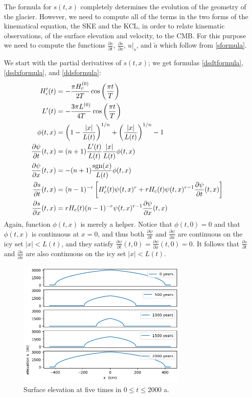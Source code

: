 \documentclass[letterpaper,final,12pt,reqno]{amsart}
\newcommand{\sgn}{\operatorname{sgn}}
\begin{document}
The formula for $s(t,x)$ completely determines the evolution of the geometry of the glacier.  However, we need to compute all of the terms in the two forms of the kinematical equation, the SKE and the KCL, in order to relate kinematic observations, of the surface elevation and velocity, to the CMB.  For this purpose we need to compute the functions $\frac{\partial s}{\partial t}$, $\frac{\partial s}{\partial x}$, $u|_s$, and $\tilde a$ which follow from \eqref{sformula}.

We start with the partial derivatives of $s(t,x)$; we get formulas \eqref{dsdtformula}, \eqref{dsdxformula}, and \eqref{ddsformula}:
\begin{align}
H_c'(t) &= - \frac{\pi H_c^{(0)}}{2T} \cos\left(\frac{\pi t}{T}\right) \notag\\
L'(t) &= - \frac{3 \pi L^{(0)}}{4T} \cos\left(\frac{\pi t}{T}\right) \notag \\
\phi(t,x) &= \left(1 - \frac{|x|}{L(t)}\right)^{1/n} + \left(\frac{|x|}{L(t)}\right)^{1/n} - 1 \notag \\
\frac{\partial \psi}{\partial t}(t,x) &= (n+1) \frac{L'(t)}{L(t)} \frac{|x|}{L(t)} \phi(t,x) \notag \\
\frac{\partial \psi}{\partial x}(t,x) &= - (n+1) \frac{\sgn(x)}{L(t)} \phi(t,x) \notag \\
\frac{\partial s}{\partial t}(t,x) &= (n-1)^{-r} \left[H_c'(t) \psi(t,x)^r + r H_c(t) \psi(t,x)^{r-1} \frac{\partial \psi}{\partial t}(t,x)\right] \label{dsdtformula} \\
\frac{\partial s}{\partial x}(t,x) &= r H_c(t) (n-1)^{-r} \psi(t,x)^{r-1} \frac{\partial \psi}{\partial x}(t,x) \label{dsdxformula}
\end{align}
Again, function $\phi(t,x)$ is merely a helper.  Notice that $\phi(t,0)=0$ and that $\phi(t,x)$ is continuous at $x=0$, and thus both $\frac{\partial \psi}{\partial t}$ and $\frac{\partial \psi}{\partial x}$ are continuous on the icy set $|x|<L(t)$, and they satisfy $\frac{\partial \psi}{\partial t}(t,0)=\frac{\partial \psi}{\partial x}(t,0)=0$.  It follows that $\frac{\partial s}{\partial t}$ and $\frac{\partial s}{\partial x}$ are also continuous on the icy set $|x|<L(t)$.

\begin{figure}[t]
\includegraphics[width=0.75\textwidth]{surfacesnaps}
\caption{Surface elevation at five times in $0\le t \le 2000$ a.}
\label{surfacesnaps}
\end{figure}
\end{document}
